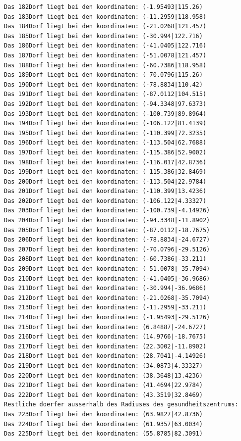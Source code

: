 \documentclass{article}
\begin{document}
\begin{verbatim}
Das 182Dorf liegt bei den koordinaten: (-1.95493|115.26)
Das 183Dorf liegt bei den koordinaten: (-11.2959|118.958)
Das 184Dorf liegt bei den koordinaten: (-21.0268|121.457)
Das 185Dorf liegt bei den koordinaten: (-30.994|122.716)
Das 186Dorf liegt bei den koordinaten: (-41.0405|122.716)
Das 187Dorf liegt bei den koordinaten: (-51.0078|121.457)
Das 188Dorf liegt bei den koordinaten: (-60.7386|118.958)
Das 189Dorf liegt bei den koordinaten: (-70.0796|115.26)
Das 190Dorf liegt bei den koordinaten: (-78.8834|110.42)
Das 191Dorf liegt bei den koordinaten: (-87.0112|104.515)
Das 192Dorf liegt bei den koordinaten: (-94.3348|97.6373)
Das 193Dorf liegt bei den koordinaten: (-100.739|89.8964)
Das 194Dorf liegt bei den koordinaten: (-106.122|81.4139)
Das 195Dorf liegt bei den koordinaten: (-110.399|72.3235)
Das 196Dorf liegt bei den koordinaten: (-113.504|62.7688)
Das 197Dorf liegt bei den koordinaten: (-115.386|52.9002)
Das 198Dorf liegt bei den koordinaten: (-116.017|42.8736)
Das 199Dorf liegt bei den koordinaten: (-115.386|32.8469)
Das 200Dorf liegt bei den koordinaten: (-113.504|22.9784)
Das 201Dorf liegt bei den koordinaten: (-110.399|13.4236)
Das 202Dorf liegt bei den koordinaten: (-106.122|4.33327)
Das 203Dorf liegt bei den koordinaten: (-100.739|-4.14926)
Das 204Dorf liegt bei den koordinaten: (-94.3348|-11.8902)
Das 205Dorf liegt bei den koordinaten: (-87.0112|-18.7675)
Das 206Dorf liegt bei den koordinaten: (-78.8834|-24.6727)
Das 207Dorf liegt bei den koordinaten: (-70.0796|-29.5126)
Das 208Dorf liegt bei den koordinaten: (-60.7386|-33.211)
Das 209Dorf liegt bei den koordinaten: (-51.0078|-35.7094)
Das 210Dorf liegt bei den koordinaten: (-41.0405|-36.9686)
Das 211Dorf liegt bei den koordinaten: (-30.994|-36.9686)
Das 212Dorf liegt bei den koordinaten: (-21.0268|-35.7094)
Das 213Dorf liegt bei den koordinaten: (-11.2959|-33.211)
Das 214Dorf liegt bei den koordinaten: (-1.95493|-29.5126)
Das 215Dorf liegt bei den koordinaten: (6.84887|-24.6727)
Das 216Dorf liegt bei den koordinaten: (14.9766|-18.7675)
Das 217Dorf liegt bei den koordinaten: (22.3002|-11.8902)
Das 218Dorf liegt bei den koordinaten: (28.7041|-4.14926)
Das 219Dorf liegt bei den koordinaten: (34.0873|4.33327)
Das 220Dorf liegt bei den koordinaten: (38.3648|13.4236)
Das 221Dorf liegt bei den koordinaten: (41.4694|22.9784)
Das 222Dorf liegt bei den koordinaten: (43.3519|32.8469)
Restliche doerfer ausserhalb des Radiuses des gesundheitszentrums: 
Das 223Dorf liegt bei den koordinaten: (63.9827|42.8736)
Das 224Dorf liegt bei den koordinaten: (61.9357|63.0034)
Das 225Dorf liegt bei den koordinaten: (55.8785|82.3091)

\end{verbatim}
\end{document}
